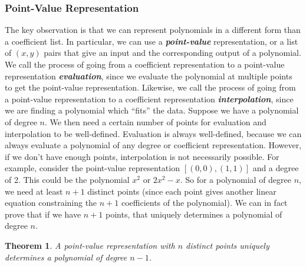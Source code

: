 \documentclass[11pt, oneside]{article}
\newcommand{\emphasis}[1]{\textbf{\textit{#1}}}
\theoremstyle{plain}
\newtheorem{theorem}{Theorem}[section]
\theoremstyle{definition}
\begin{document}
\subsubsection{Point-Value Representation}
The key observation is that we can represent polynomials in a different form
than a coefficient list. In particular, we can use a \emphasis{point-value}
representation, or a list of \( (x, y) \) pairs that give an input and the
corresponding output of a polynomial. We call the process of going from
a coefficient representation to a point-value representation
\emphasis{evaluation}, since we evaluate the polynomial at multiple points
to get the point-value representation. Likewise, we call the process of going
from a point-value representation to a coefficient representation
\emphasis{interpolation}, since we are finding a polynomial which \enquote{fits}
the data. Suppose we have a polynomial of degree \( n \). We then need
a certain number of points for evaluation and interpolation to be well-defined.
Evaluation is always well-defined, because we can always evaluate a polynomial
of any degree or coefficient representation. However, if we don't have
enough points, interpolation is not necessarily possible. For example, consider
the point-value representation \( [(0, 0), (1, 1)] \) and a degree of 2.
This could be the polynomial \( x^2 \) or \( 2x^2 - x \).
So for a polynomial of degree \( n \), we need at least \( n + 1 \)
distinct points (since each point gives another linear equation constraining
the \( n + 1 \) coefficients of the polynomial). 
We can in fact prove that if we have \( n + 1 \) points, that uniquely
determines a polynomial of degree \( n \).
\begin{theorem}
    A point-value representation with \( n \) distinct points uniquely
    determines a polynomial of degree \( n - 1 \).
\end{theorem}
\end{document}
